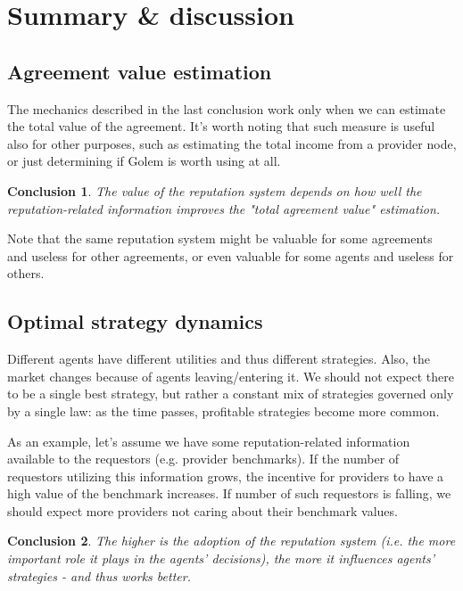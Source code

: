 \documentclass{article}
\newtheorem{conclusion}{Conclusion}[section]
\begin{document}
\section{Summary \& discussion}

\subsection{Agreement value estimation}
The mechanics described in the last conclusion work only when we can estimate the total value of the agreement.
It's worth noting that such measure is useful also for other purposes, such as estimating the total income from a provider node,
or just determining if Golem is worth using at all.

\begin{conclusion}

The value of the reputation system depends on how well the reputation-related information improves the "total agreement value" estimation.

\label{agreement value estimation}
\end{conclusion}

Note that the same reputation system might be valuable for some agreements and useless for other agreements, or even valuable for some agents and useless for others.

\subsection{Optimal strategy dynamics}

Different agents have different utilities and thus different strategies. 
Also, the market changes because of agents leaving/entering it. We should not expect there to be a single best strategy,
but rather a constant mix of strategies governed only by a single law: as the time passes, profitable strategies become more common.

As an example, let's assume we have some reputation-related information available to the requestors (e.g. provider benchmarks). 
If the number of requestors utilizing this information grows, the incentive for providers to have a high value of the benchmark increases.
If number of such requestors is falling, we should expect more providers not caring about their benchmark values.

\begin{conclusion}

The higher is the adoption of the reputation system (i.e. the more important role it plays in the agents' decisions), the more it influences agents' strategies -
and thus works better.

\label{adoption level}
\end{conclusion}
\end{document}
